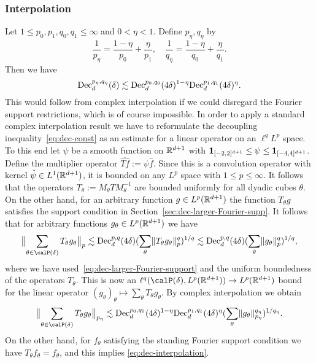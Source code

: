 \subsubsection{Interpolation}\label{sec:dec-interpolation}
Let $1 \leq p_{0},p_{1},q_{0},q_{1} \leq \infty$ and $0 < \eta < 1$.
Define $p_{\eta},q_{\eta}$ by
\[
\frac{1}{p_{\eta}} = \frac{1-\eta}{p_{0}} + \frac{\eta}{p_{1}},
\quad
\frac{1}{q_{\eta}} = \frac{1-\eta}{q_{0}} + \frac{\eta}{q_{1}}.
\]
Then we have
\begin{equation}\label{eq:dec-interpolation}
\mathrm{Dec}_{d}^{p_{\eta},q_{\eta}}(\delta)
\lesssim
\mathrm{Dec}_{d}^{p_{0},q_{0}}(4\delta)^{1-\eta} \mathrm{Dec}_{d}^{p_{1},q_{1}}(4\delta)^{\eta}.
\end{equation}
This would follow from complex interpolation if we could disregard the Fourier support restrictions, which is of course impossible.
In order to apply a standard complex interpolation result we have to reformulate the decoupling inequality~\eqref{eq:dec-const} as an estimate for a linear operator on an $\ell^{q}L^{p}$ space.
To this end let $\psi$ be a smooth function on $\mathbb{R}^{d+1}$ with $\mathbf{1}_{[-2,2]^{d+1}} \leq \psi \leq \mathbf{1}_{[-4,4]^{d+1}}$.
Define the multiplier operator $\widehat{Tf} := \psi \widehat{f}$.
Since this is a convolution operator with kernel $\check{\psi} \in L^{1}(\mathbb{R}^{d+1})$, it is bounded on any $L^{p}$ space with $1 \leq p \leq \infty$.
It follows that the operators $T_{\theta} := M_{\theta} T M_{\theta}^{-1}$ are bounded uniformly for all dyadic cubes $\theta$.
On the other hand, for an arbitrary function $g \in L^{p}(\mathbb{R}^{d+1})$ the function $T_{\theta} g$ satisfies the support condition in Section~\ref{sec:dec-larger-Fourier-supp}.
It follows that for arbitrary functions $g_{\theta} \in L^{p}(\mathbb{R}^{d+1})$ we have
\[
\norm[\big]{\sum_{\theta \in \Part{\delta}} T_{\theta} g_{\theta}}_{p}
\lesssim
\Dec_{d}^{p,q}(4\delta) (\sum_{\theta} \norm{T_{\theta} g_{\theta}}_{p}^q)^{1/q}
\lesssim
\Dec_{d}^{p,q}(4\delta) (\sum_{\theta} \norm{g_{\theta}}_{p}^q)^{1/q},
\]
where we have used~\eqref{eq:dec-larger-Fourier-support} and the uniform boundedness of the operators $T_{\theta}$.
This is now an $\ell^{q}(\Part{\delta},L^{p}(\R^{d+1})) \to L^{p}(\R^{d+1})$ bound for the linear operator $(g_{\theta})_{\theta} \mapsto \sum_{\theta} T_{\theta} g_{\theta}$.
By complex interpolation we obtain
\[
\norm[\big]{\sum_{\theta \in \Part{\delta}} T_{\theta} g_{\theta}}_{p_{\eta}}
\lesssim
\Dec_{d}^{p_{0},q_{0}}(4\delta)^{1-\eta} \Dec_{d}^{p_{1},q_{1}}(4\delta)^{\eta}
(\sum_{\theta} \norm{g_{\theta}}_{p_{\eta}}^{q_{\eta}})^{1/q_{\eta}}.
\]
On the other hand, for $f_{\theta}$ satisfying the standing Fourier support condition we have $T_{\theta}f_{\theta}=f_{\theta}$, and this implies \eqref{eq:dec-interpolation}.

